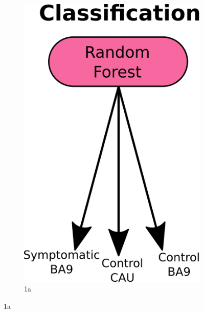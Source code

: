 \documentclass[fleqn,10pt,table]{wlscirep}
\begin{document}
\begin{figure}[ht]
\begin{subfigure}{0.30\textwidth}
\includegraphics[width=.6\linewidth]{classification.png}
\caption{1a}
\label{fig:sfig1c}
\end{subfigure}

\end{figure}
\end{document}
